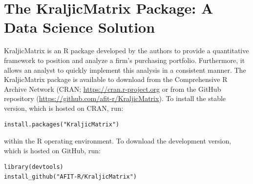 \documentclass[twocolumn]{svjour3}       %
\begin{document}
\section{The KraljicMatrix Package: A Data Science Solution}
\label{sec:4}

KraljicMatrix \citep{bmof17} is an R package developed by the authors to provide a quantitative framework to position and analyze a firm's purchasing portfolio. Furthermore, it allows an analyst to quickly implement this analysis in a consistent manner. The KraljicMatrix package is available to download from the Comprehensive R Archive Network (CRAN; \url{https://cran.r-project.org} or from the GitHub repository (\url{https://github.com/afit-r/KraljicMatrix}). To install the stable version, which is hosted on CRAN, run:
\begin{Verbatim}[fontsize=\footnotesize]
install.packages("KraljicMatrix")
\end{Verbatim}
within the R operating environment. To download the development version, which is hosted on GitHub, run:
\begin{Verbatim}[fontsize=\footnotesize]
library(devtools)
install_github("AFIT-R/KraljicMatrix")
\end{Verbatim}
\end{document}
